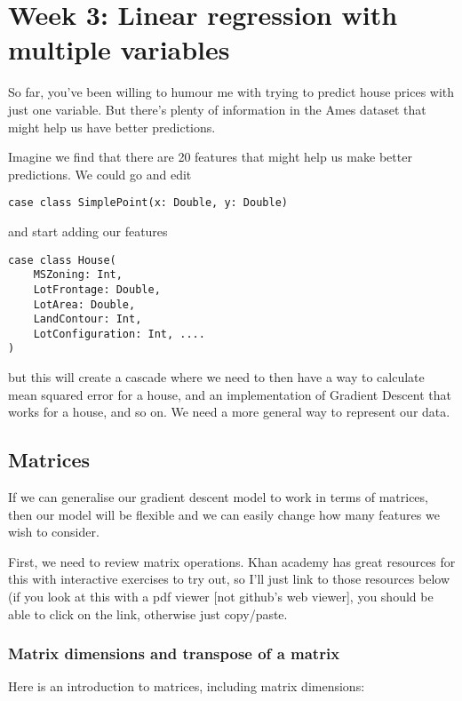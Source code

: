 \documentclass[11pt]{article}
\begin{document}
\section{Week 3: Linear regression with multiple variables}

So far, you've been willing to humour me with trying to predict house prices with just one variable. But there's plenty of information in the Ames dataset that might help us have better predictions.

Imagine we find that there are 20 features that might help us make better predictions. We could go and edit 

\begin{verbatim}
case class SimplePoint(x: Double, y: Double)
\end{verbatim}

and start adding our features

\begin{verbatim}
case class House(
	MSZoning: Int, 
	LotFrontage: Double, 
	LotArea: Double, 
	LandContour: Int, 
	LotConfiguration: Int, ....
)
\end{verbatim}

but this will create a cascade where we need to then have a way to calculate mean squared error for a house, and an implementation of Gradient Descent that works for a house, and so on. We need a more general way to represent our data. 

\subsection{Matrices}

If we can generalise our gradient descent model to work in terms of matrices, then our model will be flexible and we can easily change how many features we wish to consider. 

First, we need to review matrix operations. Khan academy has great resources for this with interactive exercises to try out, so I'll just link to those resources below (if you look at this with a pdf viewer [not github's web viewer], you should be able to click on the link, otherwise just copy/paste. 


\subsubsection{Matrix dimensions and transpose of a matrix} 

Here is an introduction to matrices, including matrix dimensions: \\
\end{document}
